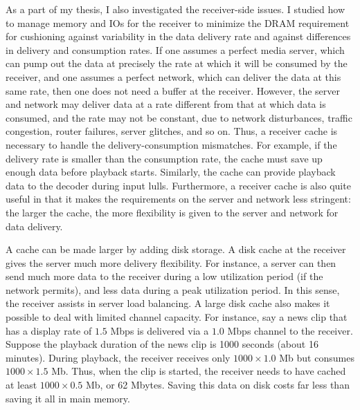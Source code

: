 As a part of my thesis, I also investigated the receiver-side issues. 
I studied how to manage memory and IOs 
for the receiver \cite{ex100}
to minimize the DRAM requirement for 
cushioning against variability in the
data delivery rate and against differences in delivery and consumption rates.
If one assumes a perfect media server, which can pump out
the data at precisely the rate at which it will be consumed by the receiver,
and one assumes a perfect network, which can deliver the data
at this same rate, then one does not need a buffer at the receiver.
However, the server and network may deliver data at a rate
different from that at which data is consumed, and the rate may not 
be constant, due to network disturbances, traffic congestion, router failures,
server glitches, and so on.  Thus, a receiver cache is necessary 
to handle the delivery-consumption mismatches.
For example, if the delivery rate is smaller than the consumption rate,
the cache must save up enough data before playback starts.
Similarly, the cache can provide playback data to the decoder 
during input lulls.  Furthermore, a receiver cache is also quite 
useful in that it makes the requirements on the server and network
less stringent: the larger the cache, the more flexibility is given 
to the server and network for data delivery.
                                                 
A cache can be made larger by adding disk storage.
A disk cache at the receiver gives the server
much more delivery flexibility.
For instance, a server can then send much more data to the receiver
during a low utilization period (if the network permits),
and less data during a peak utilization period.
In this sense, the receiver assists in server load balancing.
%                               
A large disk cache also makes it possible to deal with
limited channel capacity.
For instance, say a news clip that has a display
rate of $1.5$ Mbps is delivered via a $1.0$ Mbps
channel to the receiver.   Suppose the playback
duration of the news clip is 1000 seconds (about 16 minutes).
During playback, the receiver receives only $1000 \times 1.0$ Mb
but consumes $1000 \times 1.5$ Mb.
Thus, when the clip is started, the receiver needs to have cached
at least $1000 \times 0.5$ Mb, or 62 Mbytes.
Saving this data on disk costs far less than saving it all
in main memory.
               
